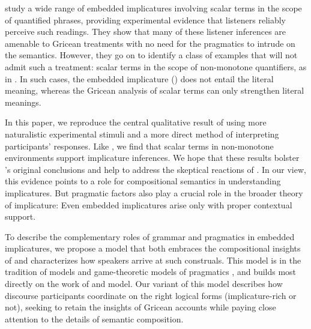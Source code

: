 \documentclass[leqno,12pt]{article}
\begin{document}
\citet{Chemla:Spector:2011} study a wide range of embedded
implicatures involving scalar terms in the scope of quantified
phrases, providing experimental evidence that listeners reliably
perceive such readings. They show that many of these listener
inferences are amenable to Gricean treatments with no need for the
pragmatics to intrude on the semantics. However, they go on to
identify a class of examples that will not admit such a treatment:
scalar terms in the scope of non-monotone quantifiers, as in
. In such cases, the
embedded implicature ()
does not entail the literal meaning, whereas the Gricean analysis of
scalar terms can only strengthen literal meanings.


In this paper, we reproduce the central qualitative result of
\citet{Chemla:Spector:2011} using more naturalistic experimental
stimuli and a more direct method of interpreting participants'
responses. Like \citeauthor{Chemla:Spector:2011}, we find that scalar
terms in non-monotone environments support implicature inferences. We
hope that these results bolster \citeauthor{Chemla:Spector:2011}'s
original conclusions and help to address the skeptical reactions of
\citet{geurts-vantiel:2013:scalar}. In our view, this evidence points
to a role for compositional semantics in understanding implicatures. But pragmatic factors also play a crucial role in the broader
theory of implicature: Even embedded implicatures arise only with 
proper contextual support. 

To describe the complementary roles of grammar and pragmatics in
embedded implicatures, we
propose a model that both embraces the compositional insights of
\citeauthor{ChierchiaFoxSpector08} and characterizes how speakers
arrive at such construals. This model is in the tradition of
 models
\citep{Frank:Goodman:2012,Goodman:Stuhlmuller:2013} and game-theoretic
models of pragmatics \citep{Franke09DISS,Jaeger:2011}, and builds most
directly on the work of  and
 
model. Our variant of this model describes how discourse
participants coordinate on the right logical forms (implicature-rich
or not), seeking to retain the insights of Gricean accounts while paying close
attention to the details of semantic composition.
\end{document}
